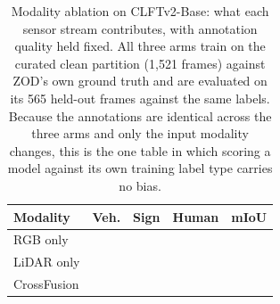 \begin{table}[t]
\centering
\caption{Modality ablation on CLFTv2-Base: what each sensor stream contributes, with annotation
         quality held fixed. All three arms train on the curated clean partition (1{,}521 frames)
         against ZOD's own ground truth and are evaluated on its 565 held-out frames against the same
         labels. Because the annotations are identical across the three arms and only the input
         modality changes, this is the one table in which scoring a model against its own training
         label type carries no bias. \pendingnote}
\label{tab:modality_ablation}
\begin{tabular}{lcccc}
\toprule
\textbf{Modality} & \textbf{Veh.} & \textbf{Sign} & \textbf{Human} & \textbf{mIoU} \\
\midrule
RGB only        & \pending{--} & \pending{--} & \pending{--} & \pending{--} \\
LiDAR only      & \pending{--} & \pending{--} & \pending{--} & \pending{--} \\
CrossFusion     & \pending{--} & \pending{--} & \pending{--} & \pending{--} \\
\bottomrule
\end{tabular}
\end{table}
